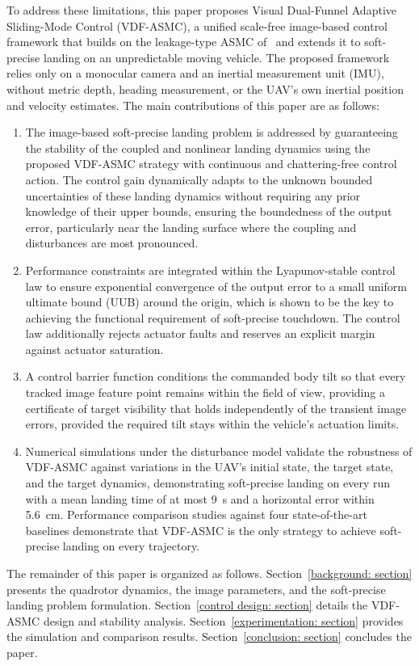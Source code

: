 \documentclass{IEEEtaes}
\begin{document}
To address these limitations, this paper proposes Visual Dual-Funnel Adaptive Sliding-Mode Control (VDF-ASMC), a unified scale-free image-based control framework that builds on the leakage-type ASMC of~\cite{singhal2025} and extends it to soft-precise landing on an unpredictable moving vehicle. The proposed framework relies only on a monocular camera and an inertial measurement unit (IMU), without metric depth, heading measurement, or the UAV's own inertial position and velocity estimates. The main contributions of this paper are as follows:
\begin{enumerate}
\item The image-based soft-precise landing problem is addressed by guaranteeing the stability of the coupled and nonlinear landing dynamics using the proposed VDF-ASMC strategy with continuous and chattering-free control action. The control gain dynamically adapts to the unknown bounded uncertainties of these landing dynamics without requiring any prior knowledge of their upper bounds, ensuring the boundedness of the output error, particularly near the landing surface where the coupling and disturbances are most pronounced.
\item Performance constraints are integrated within the Lyapunov-stable control law to ensure exponential convergence of the output error to a small uniform ultimate bound (UUB) around the origin, which is shown to be the key to achieving the functional requirement of soft-precise touchdown. The control law additionally rejects actuator faults and reserves an explicit margin against actuator saturation.
\item A control barrier function conditions the commanded body tilt so that every tracked image feature point remains within the field of view, providing a certificate of target visibility that holds independently of the transient image errors, provided the required tilt stays within the vehicle's actuation limits.
\item Numerical simulations under the disturbance model validate the robustness of VDF-ASMC against variations in the UAV's initial state, the target state, and the target dynamics, demonstrating soft-precise landing on every run with a mean landing time of at most 9~s and a horizontal error within 5.6~cm. Performance comparison studies against four state-of-the-art baselines demonstrate that VDF-ASMC is the only strategy to achieve soft-precise landing on every trajectory.
\end{enumerate}
The remainder of this paper is organized as follows. Section~\ref{background: section} presents the quadrotor dynamics, the image parameters, and the soft-precise landing problem formulation. Section~\ref{control design: section} details the VDF-ASMC design and stability analysis. Section~\ref{experimentation: section} provides the simulation and comparison results. Section~\ref{conclusion: section} concludes the paper.
\end{document}
